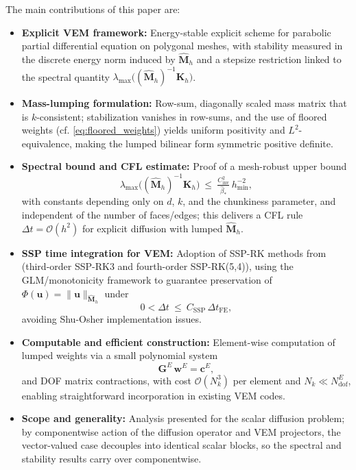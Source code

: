 \documentclass{article}
\renewcommand{\u}{\mathbf{u}}
\newcommand{\K}{\mathbf{K}_h}
\newcommand{\M}{\hat{\mathbf{M}}_h}
\begin{document}
The main contributions of this paper are:
\begin{itemize}
    \item \textbf{Explicit VEM framework:} Energy-stable explicit scheme for parabolic partial differential equation on polygonal meshes, with stability measured in the discrete energy norm induced by $\M$ and a stepsize restriction linked to the spectral quantity $\lambda_{\max}\!\big((\M)^{-1}\K\big)$.
    \item \textbf{Mass-lumping formulation:} Row-sum, diagonally scaled mass matrix that is $k$-consistent; stabilization vanishes in row-sums, and the use of floored weights (cf. \eqref{eq:floored_weights}) yields uniform positivity and $L^2$-equivalence, making the lumped bilinear form symmetric positive definite.
    \item \textbf{Spectral bound and CFL estimate:} Proof of a mesh-robust upper bound
    \begin{equation}
        \nonumber
        \lambda_{\max}\!\big((\M)^{-1}\K\big)\ \le\ \tfrac{C_{\mathrm{inv}}^2}{\hat{\beta}_*}\,h_{\min}^{-2},
    \end{equation}
    with constants depending only on $d$, $k$, and the chunkiness parameter, and independent of the number of faces/edges; this delivers a CFL rule $\Delta t=\mathcal{O}(h^2)$ for explicit diffusion with lumped $\M$.
    \item \textbf{SSP time integration for VEM:} Adoption of SSP-RK methods from \cite{izzo2022ssp} (third-order SSP-RK3 and fourth-order SSP-RK(5,4)), using the GLM/monotonicity framework to guarantee preservation of $\Phi(\u)=\|\u\|_{\M}$ under
    \begin{equation}
        \nonumber
        0<\Delta t \ \le\ C_{\mathrm{SSP}}\,\Delta t_{\mathrm{FE}},
    \end{equation}
    avoiding Shu-Osher implementation issues.
    \item \textbf{Computable and efficient construction:} Element-wise computation of lumped weights via a small polynomial system
    \begin{equation}
        \nonumber
        \mathbf{G}^E\,\mathbf{w}^E=\mathbf{c}^E,
    \end{equation}
    and DOF matrix contractions, with cost $\mathcal{O}(N_k^3)$ per element and $N_k \ll N_{\text{dof}}^E$, enabling straightforward incorporation in existing VEM codes.
    \item \textbf{Scope and generality:} Analysis presented for the scalar diffusion problem; by componentwise action of the diffusion operator and VEM projectors, the vector-valued case decouples into identical scalar blocks, so the spectral and stability results carry over componentwise.
\end{itemize}
\end{document}
